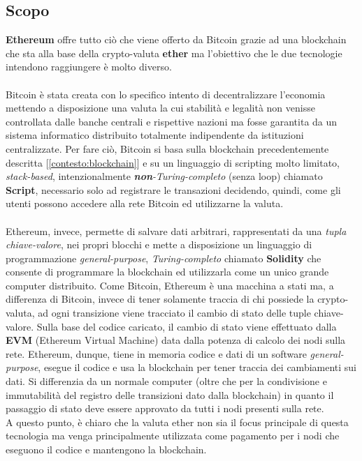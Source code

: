    \subsection{Scopo}
    \textbf{Ethereum} offre tutto ciò che viene offerto da Bitcoin grazie ad una blockchain che sta alla base della crypto-valuta \textbf{ether} ma l'obiettivo che le due tecnologie intendono raggiungere è molto diverso.
    \\\\
    Bitcoin è stata creata con lo specifico intento di decentralizzare l'economia mettendo a disposizione una valuta la cui stabilità e legalità non venisse controllata dalle banche centrali e rispettive nazioni ma fosse garantita da un sistema informatico distribuito totalmente indipendente da istituzioni centralizzate. Per fare ciò, Bitcoin si basa sulla blockchain precedentemente descritta [\autoref{contesto:blockchain}] e su un linguaggio di scripting molto limitato, \textit{stack-based}, intenzionalmente \textit{\textbf{non}-Turing-completo} (senza loop) chiamato \textbf{Script}, necessario solo ad registrare le transazioni decidendo, quindi, come gli utenti possono accedere alla rete Bitcoin ed utilizzarne la valuta.
    \\\\
    Ethereum, invece, permette di salvare dati arbitrari, rappresentati da una \textit{tupla chiave-valore}, nei propri blocchi e mette a disposizione un linguaggio di programmazione \textit{general-purpose}, \textit{Turing-completo} chiamato \textbf{Solidity} che consente di programmare la blockchain ed utilizzarla come un unico grande computer distribuito. Come Bitcoin, Ethereum è una macchina a stati ma, a differenza di Bitcoin, invece di tener solamente traccia di chi possiede la crypto-valuta, ad ogni transizione viene tracciato il cambio di stato delle tuple chiave-valore. Sulla base del codice caricato, il cambio di stato viene effettuato dalla \textbf{EVM} (Ethereum Virtual Machine) data dalla potenza di calcolo dei nodi sulla rete. Ethereum, dunque, tiene in memoria codice e dati di un software \textit{general-purpose}, esegue il codice e usa la blockchain per tener traccia dei cambiamenti sui dati. Si differenzia da un normale computer (oltre che per la condivisione e immutabilità del registro delle transizioni dato dalla blockchain) in quanto il passaggio di stato deve essere approvato da tutti i nodi presenti sulla rete.\\
    A questo punto, è chiaro che la valuta ether non sia il focus principale di questa tecnologia ma venga principalmente utilizzata come pagamento per i nodi che eseguono il codice e mantengono la blockchain.

